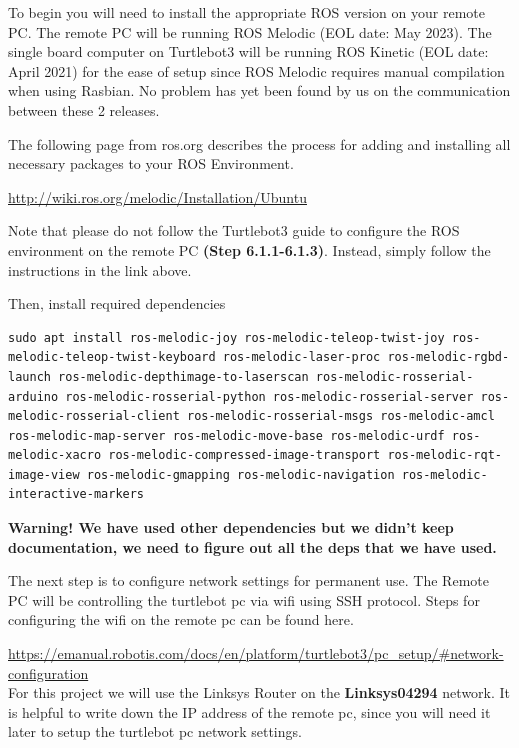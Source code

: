 \documentclass[12]{article}
\begin{document}
To begin you will need to install the appropriate ROS version on your remote PC. The remote PC will be running ROS Melodic (EOL date: May 2023). 
The single board computer on Turtlebot3 will be running ROS Kinetic (EOL date: April 2021) for the ease of setup since ROS Melodic requires manual compilation when using Rasbian. 
No problem has yet been found by us on the communication between these 2 releases. 

The following page from ros.org describes the process for adding and installing all necessary packages to your ROS Environment.

\url{http://wiki.ros.org/melodic/Installation/Ubuntu} 

Note that please do not follow the Turtlebot3 guide to configure the ROS environment on the remote PC \textbf{(Step 6.1.1-6.1.3)}. 
Instead, simply follow the instructions in the link above.

Then, install required dependencies
\begin{lstlisting}[style=bash]
sudo apt install ros-melodic-joy ros-melodic-teleop-twist-joy ros-melodic-teleop-twist-keyboard ros-melodic-laser-proc ros-melodic-rgbd-launch ros-melodic-depthimage-to-laserscan ros-melodic-rosserial-arduino ros-melodic-rosserial-python ros-melodic-rosserial-server ros-melodic-rosserial-client ros-melodic-rosserial-msgs ros-melodic-amcl ros-melodic-map-server ros-melodic-move-base ros-melodic-urdf ros-melodic-xacro ros-melodic-compressed-image-transport ros-melodic-rqt-image-view ros-melodic-gmapping ros-melodic-navigation ros-melodic-interactive-markers
\end{lstlisting}

\textbf{Warning! We have used other dependencies but we didn't keep documentation, we need to figure out all the deps that we have used.}

The next step is to configure network settings for permanent use. 
The Remote PC will be controlling the turtlebot pc via wifi using SSH protocol. 
Steps for configuring the wifi on the remote pc can be found here.

\url {https://emanual.robotis.com/docs/en/platform/turtlebot3/pc_setup/#network-configuration} \\

For this project we will use the Linksys Router on the \textbf{Linksys04294} network. It is helpful to write down the IP address of the remote pc, since you will need it later to setup the turtlebot pc network settings.\\\\
\end{document}
